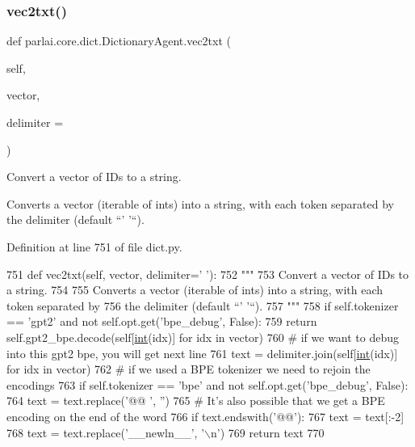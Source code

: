 \subsubsection{\texorpdfstring{vec2txt()}{vec2txt()}}
{\footnotesize\ttfamily def parlai.\+core.\+dict.\+Dictionary\+Agent.\+vec2txt (\begin{DoxyParamCaption}\item[{}]{self,  }\item[{}]{vector,  }\item[{}]{delimiter = {\ttfamily \textquotesingle{}~\textquotesingle{}} }\end{DoxyParamCaption})}

\begin{DoxyVerb}Convert a vector of IDs to a string.

Converts a vector (iterable of ints) into a string, with each token separated by
the delimiter (default ``' '``).
\end{DoxyVerb}
 

Definition at line 751 of file dict.\+py.


\begin{DoxyCode}
751     \textcolor{keyword}{def }vec2txt(self, vector, delimiter=' '):
752         \textcolor{stringliteral}{"""}
753 \textcolor{stringliteral}{        Convert a vector of IDs to a string.}
754 \textcolor{stringliteral}{}
755 \textcolor{stringliteral}{        Converts a vector (iterable of ints) into a string, with each token separated by}
756 \textcolor{stringliteral}{        the delimiter (default ``' '``).}
757 \textcolor{stringliteral}{        """}
758         \textcolor{keywordflow}{if} self.tokenizer == \textcolor{stringliteral}{'gpt2'} \textcolor{keywordflow}{and} \textcolor{keywordflow}{not} self.opt.get(\textcolor{stringliteral}{'bpe\_debug'}, \textcolor{keyword}{False}):
759             \textcolor{keywordflow}{return} self.gpt2\_bpe.decode(self[\hyperlink{namespacelanguage__model_1_1eval__ppl_a7d12ee00479673c5c8d1f6d01faa272a}{int}(idx)] \textcolor{keywordflow}{for} idx \textcolor{keywordflow}{in} vector)
760         \textcolor{comment}{# if we want to debug into this gpt2 bpe, you will get next line}
761         text = delimiter.join(self[\hyperlink{namespacelanguage__model_1_1eval__ppl_a7d12ee00479673c5c8d1f6d01faa272a}{int}(idx)] \textcolor{keywordflow}{for} idx \textcolor{keywordflow}{in} vector)
762         \textcolor{comment}{# if we used a BPE tokenizer we need to rejoin the encodings}
763         \textcolor{keywordflow}{if} self.tokenizer == \textcolor{stringliteral}{'bpe'} \textcolor{keywordflow}{and} \textcolor{keywordflow}{not} self.opt.get(\textcolor{stringliteral}{'bpe\_debug'}, \textcolor{keyword}{False}):
764             text = text.replace(\textcolor{stringliteral}{'@@ '}, \textcolor{stringliteral}{''})
765             \textcolor{comment}{# It's also possible that we get a BPE encoding on the end of the word}
766             \textcolor{keywordflow}{if} text.endswith(\textcolor{stringliteral}{'@@'}):
767                 text = text[:-2]
768             text = text.replace(\textcolor{stringliteral}{'\_\_newln\_\_'}, \textcolor{stringliteral}{'\(\backslash\)n'})
769         \textcolor{keywordflow}{return} text
770 
\end{DoxyCode}


